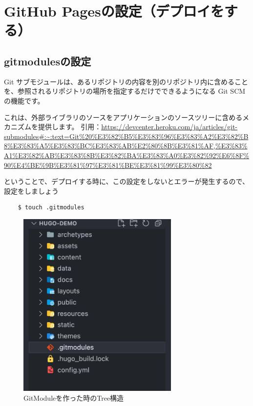 \chapter{GitHub Pagesの設定（デプロイをする）}
\section{gitmodulesの設定}

  \begin{tcolorbox}[title=gitmodulesとは]
    Git サブモジュールは、あるリポジトリの内容を別のリポジトリ内に含めることを、参照されるリポジトリの場所を指定するだけでできるようになる Git SCMの機能です。 
    
    これは、外部ライブラリのソースをアプリケーションのソースツリーに含めるメカニズムを提供します。
    引用：\url{https://devcenter.heroku.com/ja/articles/git-submodules#:~:text=Git%20%E3%82%B5%E3%83%96%E3%83%A2%E3%82%B8%E3%83%A5%E3%83%BC%E3%83%AB%E2%80%8B%E3%81%AF,%E3%83%A1%E3%82%AB%E3%83%8B%E3%82%BA%E3%83%A0%E3%82%92%E6%8F%90%E4%BE%9B%E3%81%97%E3%81%BE%E3%81%99%E3%80%82}

  \end{tcolorbox}

  ということで、デプロイする時に、この設定をしないとエラーが発生するので、設定をしましょう

  \begin{shaded}
    \begin{verbatim}
    $ touch .gitmodules
    \end{verbatim}
  \end{shaded}

  \begin{figure}[H]
    \centering
    \includegraphics[width=8cm]{./image/02-chap6/make-modules-tree.png}
    \caption{GitModuleを作った時のTree構造}
    \label{chap6-make-modules-tree-image}
  \end{figure}

